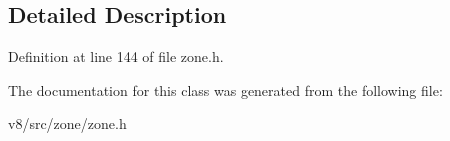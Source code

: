 \subsection{Detailed Description}


Definition at line 144 of file zone.\+h.



The documentation for this class was generated from the following file\+:\begin{DoxyCompactItemize}
\item 
v8/src/zone/zone.\+h\end{DoxyCompactItemize}
